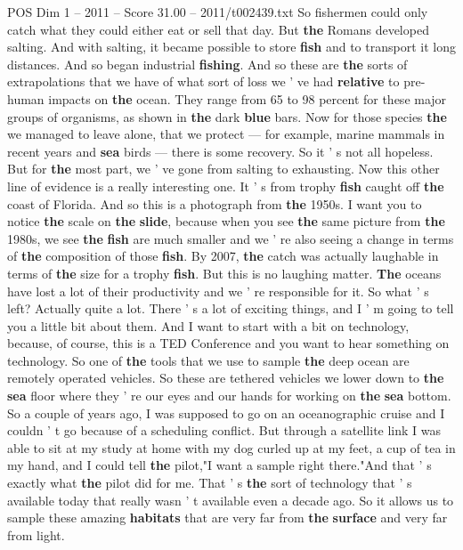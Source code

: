 \begin{textsample}{POS Dim 1 – 2011 – Score 31.00 – 2011/t002439.txt}
So fishermen could only catch what they could either eat or sell that day.
But \textbf{the} Romans developed salting.
And with salting, it became possible to store \textbf{fish} and to transport it long distances.
And so began industrial \textbf{fishing}.
And so these are \textbf{the} sorts of extrapolations that we have of what sort of loss we ' ve had \textbf{relative} to pre-human impacts on \textbf{the} ocean.
They range from 65 to 98 percent for these major groups of organisms, as shown in \textbf{the} dark \textbf{blue} bars.
Now for those species \textbf{the} we managed to leave alone, that we protect — for example, marine mammals in recent years and \textbf{sea} birds — there is some recovery.
So it ' s not all hopeless.
But for \textbf{the} most part, we ' ve gone from salting to exhausting.
Now this other line of evidence is a really interesting one.
It ' s from trophy \textbf{fish} caught off \textbf{the} coast of Florida.
And so this is a photograph from \textbf{the} 1950s.
I want you to notice \textbf{the} scale on \textbf{the} \textbf{slide}, because when you see \textbf{the} same picture from \textbf{the} 1980s, we see \textbf{the} \textbf{fish} are much smaller and we ' re also seeing a change in terms of \textbf{the} composition of those \textbf{fish}.
By 2007, \textbf{the} catch was actually laughable in terms of \textbf{the} size for a trophy \textbf{fish}.
But this is no laughing matter. \textbf{The} oceans have lost a lot of their productivity and we ' re responsible for it.
So what ' s left?
Actually quite a lot.
There ' s a lot of exciting things, and I ' m going to tell you a little bit about them.
And I want to start with a bit on technology, because, of course, this is a TED Conference and you want to hear something on technology.
So one of \textbf{the} tools that we use to sample \textbf{the} deep ocean are remotely operated vehicles.
So these are tethered vehicles we lower down to \textbf{the} \textbf{sea} floor where they ' re our eyes and our hands for working on \textbf{the} \textbf{sea} bottom.
So a couple of years ago, I was supposed to go on an oceanographic cruise and I couldn ' t go because of a scheduling conflict.
But through a satellite link I was able to sit at my study at home with my dog curled up at my feet, a cup of tea in my hand, and I could tell \textbf{the} pilot,"I want a sample right there."And that ' s exactly what \textbf{the} pilot did for me.
That ' s \textbf{the} sort of technology that ' s available today that really wasn ' t available even a decade ago.
So it allows us to sample these amazing \textbf{habitats} that are very far from \textbf{the} \textbf{surface} and very far from light.

\end{textsample}
